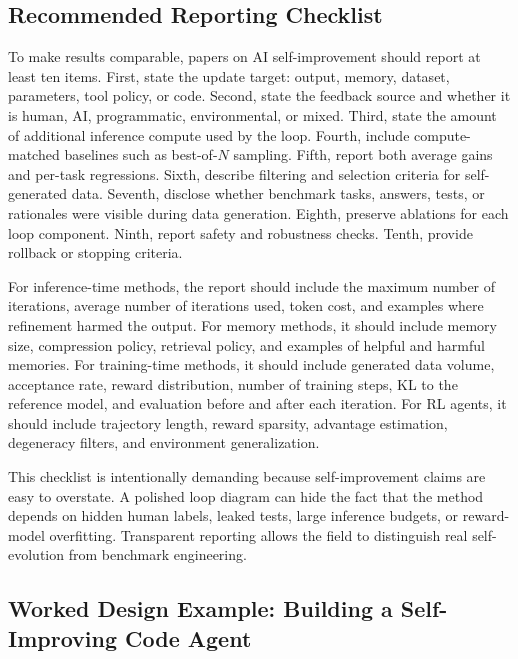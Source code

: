\subsection{Recommended Reporting Checklist}
\label{subsec:reporting-checklist}

To make results comparable, papers on AI self-improvement should report at least ten items. First, state the update target: output, memory, dataset, parameters, tool policy, or code. Second, state the feedback source and whether it is human, AI, programmatic, environmental, or mixed. Third, state the amount of additional inference compute used by the loop. Fourth, include compute-matched baselines such as best-of-$N$ sampling. Fifth, report both average gains and per-task regressions. Sixth, describe filtering and selection criteria for self-generated data. Seventh, disclose whether benchmark tasks, answers, tests, or rationales were visible during data generation. Eighth, preserve ablations for each loop component. Ninth, report safety and robustness checks. Tenth, provide rollback or stopping criteria.

For inference-time methods, the report should include the maximum number of iterations, average number of iterations used, token cost, and examples where refinement harmed the output. For memory methods, it should include memory size, compression policy, retrieval policy, and examples of helpful and harmful memories. For training-time methods, it should include generated data volume, acceptance rate, reward distribution, number of training steps, KL to the reference model, and evaluation before and after each iteration. For RL agents, it should include trajectory length, reward sparsity, advantage estimation, degeneracy filters, and environment generalization.

This checklist is intentionally demanding because self-improvement claims are easy to overstate. A polished loop diagram can hide the fact that the method depends on hidden human labels, leaked tests, large inference budgets, or reward-model overfitting. Transparent reporting allows the field to distinguish real self-evolution from benchmark engineering.


\subsection{Worked Design Example: Building a Self-Improving Code Agent}
\label{subsec:worked-code-agent-example}

